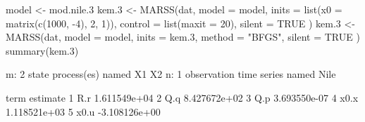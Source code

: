 \begin{Schunk}
\begin{Sinput}
 model <- mod.nile.3
 kem.3 <- MARSS(dat,
   model = model, inits = list(x0 = matrix(c(1000, -4), 2, 1)),
   control = list(maxit = 20), silent = TRUE
 )
 kem.3 <- MARSS(dat,
   model = model, inits = kem.3,
   method = "BFGS", silent = TRUE
 )
 summary(kem.3)
\end{Sinput}
\begin{Soutput}
m: 2 state process(es) named X1 X2
n: 1 observation time series named Nile

  term      estimate
1  R.r  1.611549e+04
2  Q.q  8.427672e+02
3  Q.p  3.693550e-07
4 x0.x  1.118521e+03
5 x0.u -3.108126e+00
\end{Soutput}
\end{Schunk}

